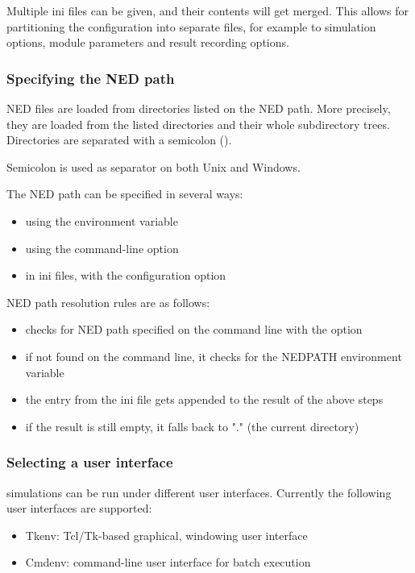 Multiple ini files can be given, and their contents will get merged. This
allows for partitioning the configuration into separate files, for example
to simulation options, module parameters and result recording options.

\subsubsection{Specifying the NED path}

NED files are loaded from directories listed on the NED path. More precisely,
they are loaded from the listed directories and their whole subdirectory trees.
Directories are separated with a semicolon (\ttt{;}).


\begin{note}
Semicolon is used as separator on both Unix and Windows.
\end{note}


The NED path can be specified in several ways:
\begin{itemize}
  \item using the  environment variable
  \item using the  command-line option
  \item in ini files, with the  configuration option
\end{itemize}

NED path resolution rules are as follows:
\begin{itemize}
  \item {\opp} checks for NED path specified on the command line with the  option
  \item if not found on the command line, it checks for the NEDPATH environment variable
  \item the  entry from the ini file gets appended to the result of the above steps
  \item if the result is still empty, it falls back to "." (the current directory)
\end{itemize}


\subsubsection{Selecting a user interface}

{\opp} simulations can be run under different user interfaces.
Currently the following user interfaces are supported:

\begin{itemize}
  \item Tkenv: Tcl/Tk-based graphical, windowing user interface
  \item Cmdenv: command-line user interface for batch execution
\end{itemize}

